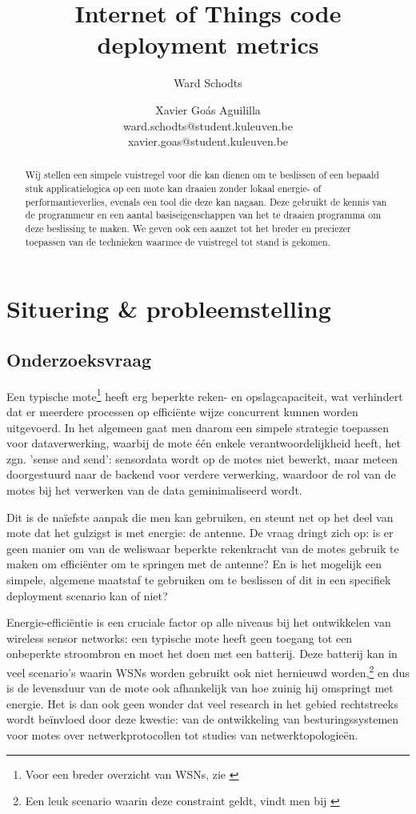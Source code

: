 \documentclass{article}
\title{Internet of Things code deployment metrics}
\author{Ward Schodts \and Xavier Go\'as Aguililla \\ ward.schodts@student.kuleuven.be \\ xavier.goas@student.kuleuven.be}
\begin{document}
\maketitle

\listoftodos

\begin{abstract}
Wij stellen een simpele vuistregel voor die kan dienen om te beslissen of een
bepaald stuk applicatielogica op een mote kan draaien zonder lokaal energie- of
performantieverlies, evenals een tool die deze kan nagaan. Deze gebruikt de
kennis van de programmeur en een aantal basiseigenschappen van het te draaien
programma om deze beslissing te maken. We geven ook een aanzet tot het breder en
preciezer toepassen van de technieken waarmee de vuistregel tot stand is gekomen.
  
\end{abstract}

\section{Situering \& probleemstelling}

\subsection{Onderzoeksvraag}

Een typische mote\footnote{Voor een breder overzicht van WSNs, zie
\cite{akyildiz2002wireless}} heeft erg beperkte reken- en opslagcapaciteit, wat
verhindert dat er meerdere processen op effici\"ente wijze concurrent kunnen
worden uitgevoerd. In het algemeen gaat men daarom een simpele strategie
toepassen voor dataverwerking, waarbij de mote \'e\'en enkele
verantwoordelijkheid heeft, het zgn. 'sense and send': sensordata wordt op de
motes niet bewerkt, maar meteen doorgestuurd naar de backend voor verdere
verwerking, waardoor de rol van de motes bij het verwerken van de data
geminimaliseerd wordt.

Dit is de na\"iefste aanpak die men kan gebruiken, en steunt net op het deel van
mote dat het gulzigst is met energie: de antenne.  De vraag dringt zich op: is
er geen manier om van de weliswaar beperkte rekenkracht van de motes gebruik te
maken om effici\"enter om te springen met de antenne? En is het mogelijk een
simpele, algemene maatstaf te gebruiken om te beslissen of dit in een specifiek
deployment scenario kan of niet?

Energie-effici\"entie is een cruciale factor op alle niveaus bij het ontwikkelen
van wireless sensor networks: een typische mote heeft geen toegang tot een
onbeperkte stroombron en moet het doen met een batterij. Deze batterij kan in
veel scenario's waarin WSNs worden gebruikt ook niet hernieuwd
worden,\footnote{Een leuk scenario waarin deze constraint geldt, vindt men bij
\cite{mainwaring2002wireless}} en dus is de levensduur van de mote ook
afhankelijk van hoe zuinig hij omspringt met energie. Het is dan ook geen wonder
dat veel research in het gebied rechtstreeks wordt be\"invloed door deze
kwestie: van de ontwikkeling van besturingssystemen voor motes over
netwerkprotocollen tot studies van netwerktopologie\"en.
\end{document}
